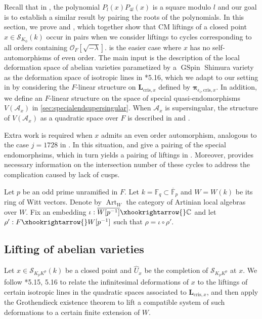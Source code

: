 \documentclass{amsart}
\numberwithin{equation}{subsection}
\numberwithin{theorem}{section}
\theoremstyle{definition}
\theoremstyle{remark}
\newcommand{\bC}{\mathbb{C}}
\newcommand{\cA}{\mathcal{A}}
\newcommand{\cO}{\mathcal{O}}
\DeclareMathOperator{\GSpin}{GSpin}
\DeclareMathOperator{\Art}{Art}
\begin{document}
Recall that in \cite{MR903384}, the polynomial $P_{l}(x)P_{4l}(x)$ is a square modulo $l$ and our goal is to establish a similar result by pairing the roots of the polynomials. In this section, we prove  and , which together show that CM liftings of a closed point $x\in \mathscr{S}_{K_0}(k)$ occur in pairs when we consider liftings to cycles corresponding to all orders containing $\cO_F[\sqrt{-\lambda}]$.  is the easier case where $x$ has no self-automorphisms of even order. The main input is the description of the local deformation space of abelian varieties parametized by a $\GSpin$ Shimura variety as the deformation space of isotropic lines in \cite{MR3484114}*{5.16}, which we adapt to our setting in  by considering the $F$-linear structure on $\bm{L}_{\mathrm{cris},x}$ defined by $\bm{\pi}_{{\epsilon_i}, \mathrm{cris}, x}$. In addition, we define an $F$-linear structure on the space of special quasi-endomorphisms $V(\cA_{x})$ in \cref{sec:specialendsupersingular}. When $\cA_x$ is supersingular, the structure of $V(\cA_{x})$ as a quadratic space over $F$ is described in  and .

Extra work is required when $x$ admits an even order automorphism, analogous to the case $j=1728$ in \cites{MR903384, MR1030140}. In this situation,  and  give a pairing of the special endomorphsims, which in turn yields a pairing of liftings in . Moreover,  provides necessary information on the intersection number of these cycles to address the complication caused by lack of cusps. 

Let $p$ be an odd prime unramified in $F$. Let $k = \mathbb{F}_q \subset \overline{\mathbb{F}}_p$ and $W=W(k)$ be its ring of Witt vectors. Denote by $\Art_W$ the category of Artinian local algebras over $W$. Fix an embedding $\iota: \overline{W[p^{-1}]}\xhookrightarrow{}\bC$ and let $\rho': F\xhookrightarrow{} W[p^{-1}]$ such that $\rho = \iota\circ \rho'$. 

\subsection{Lifting of abelian varieties}
Let $x\in \mathscr{S}_{K_pK^p}(k)$ be a closed point and $\widehat{U}_x$ be the completion of $\mathscr{S}_{K_pK^p}$ at $x$. We follow \cite{MR3484114}*{5.15, 5.16} to relate the infinitesimal deformations of $x$ to the liftings of certain isotropic lines in the quadratic spaces associated to $\bm{L}_{\mathrm{cris},x}$, and then apply the Grothendieck existence theorem to lift a compatible system of such deformations to a certain finite extension of $W$. 
\end{document}

